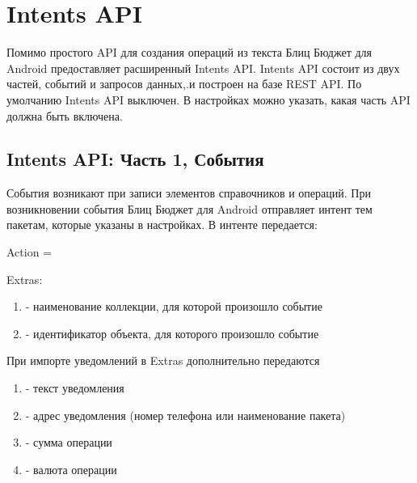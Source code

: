 \documentclass[a4paper,10pt,russian]{sphinxmanual}
\begin{document}
\section{Intents API}
\label{\detokenize{api:intents-api}}
Помимо простого API для создания операций из текста Блиц Бюджет для Android предоставляет расширенный Intents API.
Intents API  состоит из двух частей, событий и запросов данных,.и построен на базе REST API.
По умолчанию Intents API выключен. В настройках можно указать, какая часть API должна быть включена.


\subsection{Intents API: Часть 1, События}
\label{\detokenize{api:intents-api-1}}
События возникают при записи элементов справочников и операций. При возникновении события Блиц Бюджет для Android отправляет интент тем пакетам,
которые указаны в настройках. В интенте передается:

Action = 

Extras:
\begin{enumerate}
\def\theenumi{\arabic{enumi}}
\def\labelenumi{\theenumi .}
\makeatletter\def\p@enumii{\p@enumi \theenumi .}\makeatother
\item {} 
 - наименование коллекции, для которой произошло событие

\item {} 
 - идентификатор объекта, для которого произошло событие

\end{enumerate}

При импорте уведомлений в Extras дополнительно передаются
\begin{enumerate}
\def\theenumi{\arabic{enumi}}
\def\labelenumi{\theenumi .}
\makeatletter\def\p@enumii{\p@enumi \theenumi .}\makeatother
\item {} 
 - текст уведомления

\item {} 
 - адрес уведомления (номер телефона или наименование пакета)

\item {} 
 - сумма операции

\item {} 
 - валюта операции

\end{enumerate}
\end{document}
